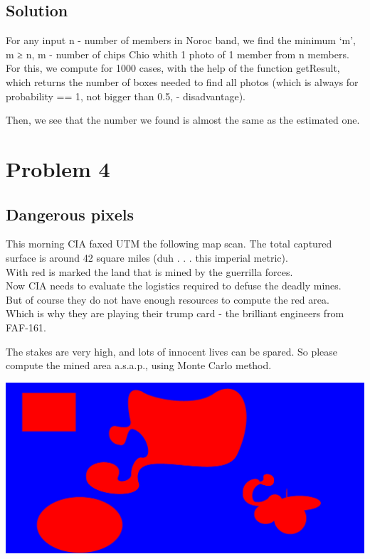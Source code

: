 \documentclass{article}
\begin{document}
    \subsection{Solution}

    For any input n - number of members in Noroc band, we find the minimum `m',
    m ≥ n, m - number of chips Chio whith 1 photo of 1 member from n members.
    For this, we compute for 1000 cases, with the help of the function getResult,
    which returns the number of boxes needed to find all photos (which is always
    for probability == 1, not bigger than  0.5, - disadvantage).

    Then, we see that the number we found is almost the same as the estimated one.

  \newpage

  \section{Problem 4}

    \subsection{Dangerous pixels}

    \hspace{5mm}This morning CIA faxed UTM the following map scan. The total captured
    surface is around 42 square miles (duh . . . this imperial metric).\\ With red is
    marked the land that is mined by the guerrilla forces.\\ Now CIA needs to evaluate
    the logistics required to defuse the deadly mines.\\ But of course they do not have
    enough resources to compute the red area.\\ Which is why they are playing their
    trump card - the brilliant engineers from FAF-161.

    The stakes are very high, and lots of innocent lives can be spared. So please
    compute the mined area a.s.a.p., using Monte Carlo method.

    \includegraphics[scale=0.1]{forlab}
\end{document}
